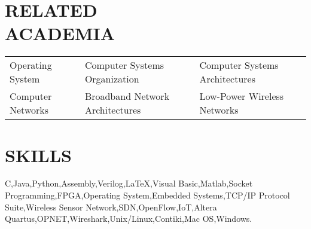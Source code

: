 \documentclass[margin,line]{resume}
\begin{document}
\begin{resume}
    \section{\mysidestyle \textbf{\large{R}\small{ELATED\\ACADEMIA}}} 

	\vspace{1mm} %
	\begin{tabular}{@{}p{4cm}p{5.5cm}p{5.5cm}}
	Operating System     &  Computer Systems Organization        &  Computer Systems Architectures\\
	Computer Networks    &  Broadband Network Architectures      &  Low-Power Wireless Networks
	\vspace{4mm}
	\end{tabular}


\sectionline

    \section{\mysidestyle \textbf{\large{S}\small{KILLS}}}

    C,\hspace{2mm}Java,\hspace{2mm}Python,\hspace{2mm}Assembly,\hspace{2mm}Verilog,\hspace{2mm}\LaTeX,\hspace{2mm}Visual Basic,\hspace{2mm}Matlab,\hspace{2mm}Socket Programming,\hspace{2mm}FPGA,\hspace{2mm}Operating System,\hspace{2mm}Embedded Systems,\hspace{2mm}TCP/IP Protocol Suite,\hspace{2mm}Wireless Sensor Network,\hspace{2mm}SDN,\hspace{2mm}OpenFlow,\hspace{2mm}IoT,\hspace{2mm}Altera Quartus,\hspace{2mm}OPNET,\hspace{2mm}Wireshark,\hspace{2mm}Unix/Linux,\hspace{2mm}Contiki,\hspace{2mm}Mac OS,\hspace{2mm}Windows.


\end{resume}
\end{document}
